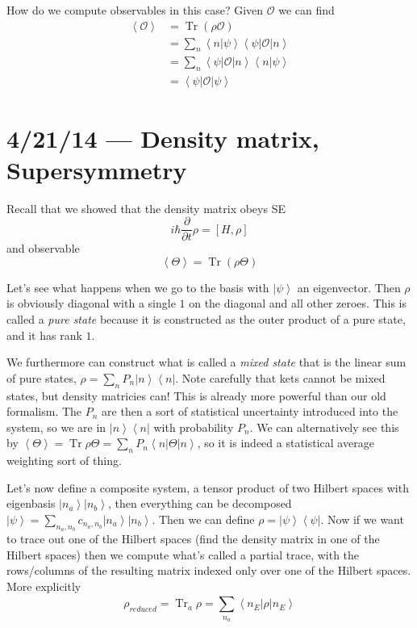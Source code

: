 \documentclass[10pt]{report}
\newcommand{\bra}[1]{\left<#1\right|}
\newcommand{\ket}[1]{\left|#1\right>}
\newcommand{\dotp}[2]{\left<#1\left.\right|#2\right>}
\newcommand{\pd}[2]{\frac{\partial #1}{\partial#2}}
\newcommand{\expvalue}[1]{\left<#1\right>}
\DeclareMathOperator{\Tr}{Tr}
\begin{document}
How do we compute observables in this case? Given $\mathcal{O}$ we can find
\begin{align}
    \expvalue{\mathcal{O}} &= \Tr(\rho\mathcal{O})\\
    &= \sum_{n}^{}\dotp{n}{\psi}\bra{\psi}\mathcal{O}\ket{n}\\
    &= \sum_{n}^{}\bra{\psi}\mathcal{O}\ket{n}\dotp{n}{\psi}\\
    &= \bra{\psi}\mathcal{O}\ket{\psi}
\end{align}

\chapter{4/21/14 --- Density matrix, Supersymmetry}

Recall that we showed that the density matrix obeys SE
\begin{equation}
    i\hbar \pd{}{t}\rho = \left[ H,\rho \right]
\end{equation}
and observable
\begin{equation}
    \expvalue{\Theta} = \Tr(\rho\Theta)
\end{equation}

Let's see what happens when we go to the basis with $\ket{\psi}$ an eigenvector. Then $\rho$ is obviously diagonal with a single $1$ on the diagonal and all other zeroes. This is called a \emph{pure state} because it is constructed as the outer product of a pure state, and it has rank $1$.

We furthermore can construct what is called a \emph{mixed state} that is the linear sum of pure states, $\rho = \sum_{n}^{}P_n \ket{n}\bra{n}$. Note carefully that kets cannot be mixed states, but density matricies can! This is already more powerful than our old formalism. The $P_n$ are then a sort of statistical uncertainty introduced into the system, so we are in $\ket{n}\bra{n}$ with probability $P_n$. We can alternatively see this by $\expvalue{\Theta} = \Tr \rho\Theta = \sum_{n}^{}P_n\bra{n}\Theta\ket{n}$, so it is indeed a statistical average weighting sort of thing. 

Let's now define a composite system, a tensor product of two Hilbert spaces with eigenbasis $\ket{n_a}\ket{n_b}$, then everything can be decomposed $\ket{\psi} = \sum_{n_a, n_b}^{}c_{n_a,n_b}\ket{n_a}\ket{n_b}$. Then we can define $\rho = \ket{\psi}\bra{\psi}$. Now if we want to trace out one of the Hilbert spaces (find the density matrix in one of the Hilbert spaces) then we compute what's called a partial trace, with the rows/columns of the resulting matrix indexed only over one of the Hilbert spaces. More explicitly
\begin{equation}
    \rho_{reduced} = \Tr_a \rho = \sum_{n_a}^{}\bra{n_E}\rho\ket{n_E}
\end{equation}
\end{document}
